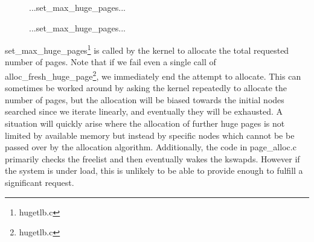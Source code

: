 \documentclass{article}
\begin{document}
\begin{figure}[h]
...set\_max\_huge\_pages...

\label{figure:Excerpt of Original set_max_huge_pages}
...set\_max\_huge\_pages...
\end{figure}

set\_max\_huge\_pages\footnote{hugetlb.c} is called by the kernel to allocate the total requested number of pages. Note that if we fail even a single call of alloc\_fresh\_huge\_page\footnote{hugetlb.c}, we immediately end the attempt to allocate. This can sometimes be worked around by asking the kernel repeatedly to allocate the number of pages, but the allocation will be biased towards the initial nodes searched since we iterate linearly, and eventually they will be exhausted. A situation will quickly arise where the allocation of further huge pages is not limited by available memory but instead by specific nodes which cannot be be passed over by the allocation algorithm. Additionally, the code in page\_alloc.c primarily checks the freelist and then eventually wakes the kswapds. However if the system is under load, this is unlikely to be able to provide enough to fulfill a significant request.
\end{document}

